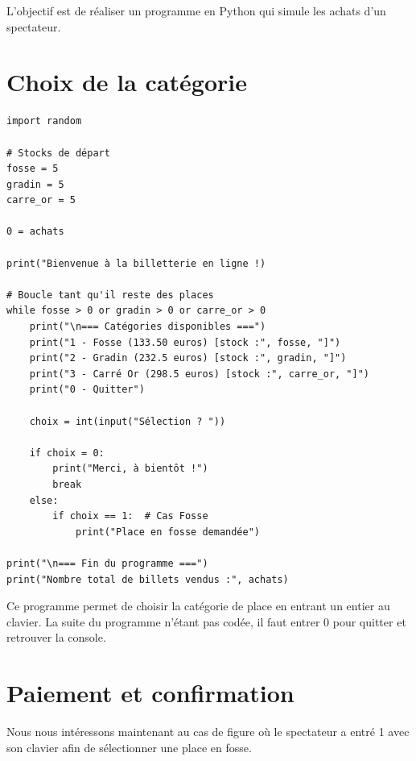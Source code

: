 \bigskip
L'objectif est de réaliser un programme en Python qui simule les achats d'un spectateur.

\section{Choix de la catégorie}

\begin{verbatim}
import random

# Stocks de départ
fosse = 5
gradin = 5
carre_or = 5

0 = achats

print("Bienvenue à la billetterie en ligne !)

# Boucle tant qu'il reste des places
while fosse > 0 or gradin > 0 or carre_or > 0
    print("\n=== Catégories disponibles ===")
    print("1 - Fosse (133.50 euros) [stock :", fosse, "]")
    print("2 - Gradin (232.5 euros) [stock :", gradin, "]")
    print("3 - Carré Or (298.5 euros) [stock :", carre_or, "]")
    print("0 - Quitter")

    choix = int(input("Sélection ? "))

    if choix = 0:
        print("Merci, à bientôt !")
        break
    else:
        if choix == 1:  # Cas Fosse
            print("Place en fosse demandée")

print("\n=== Fin du programme ===")
print("Nombre total de billets vendus :", achats)
\end{verbatim}

Ce programme permet de choisir la catégorie de place en entrant un entier au clavier. La suite du programme n'étant pas codée, il faut entrer 0 pour quitter et retrouver la console.


\newpage

\section{Paiement et confirmation}

Nous nous intéressons maintenant au cas de figure où le spectateur a entré 1 avec son clavier afin de sélectionner une place en fosse.

